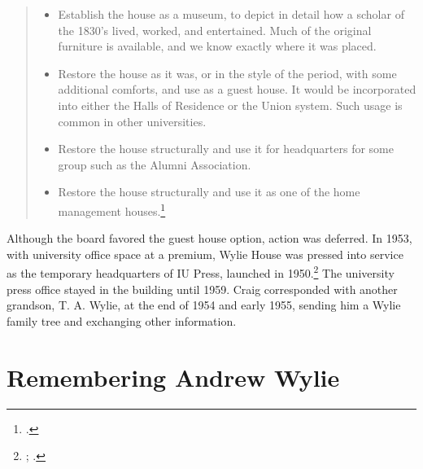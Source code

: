 \documentclass[
  american,
  letterpaper,
]{scrreprt}
\providecommand{\tightlist}{%
  \setlength{\itemsep}{0pt}\setlength{\parskip}{0pt}}\usepackage{longtable,booktabs,array}
\begin{document}
\begin{quote}
\begin{itemize}
\tightlist
\item
  Establish the house as a museum, to depict in detail how a scholar of
  the 1830's lived, worked, and entertained. Much of the original
  furniture is available, and we know exactly where it was placed.
\item
  Restore the house as it was, or in the style of the period, with some
  additional comforts, and use as a guest house. It would be
  incorporated into either the Halls of Residence or the Union system.
  Such usage is common in other universities.
\item
  Restore the house structurally and use it for headquarters for some
  group such as the Alumni Association.
\item
  Restore the house structurally and use it as one of the home
  management houses.\footnote{.}
\end{itemize}
\end{quote}

Although the board favored the guest house option, action was deferred.
In 1953, with university office space at a premium, Wylie House was
pressed into service as the temporary headquarters of IU Press, launched
in 1950.\footnote{;
  .} The university press office stayed in the building until
1959. Craig corresponded with another grandson, T. A. Wylie, at the end
of 1954 and early 1955, sending him a Wylie family tree and exchanging
other information.

\section{Remembering Andrew Wylie}\label{remembering-andrew-wylie}
\end{document}
